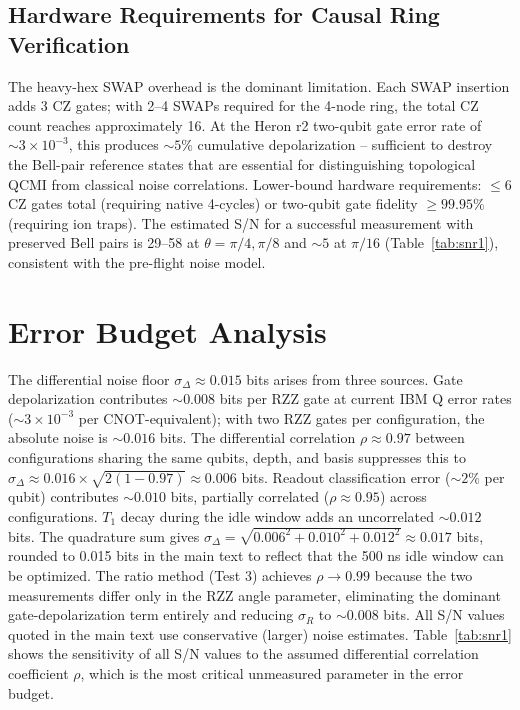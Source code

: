 \documentclass[aps,prl,superscriptaddress,nofootinbib]{revtex4-2}
\begin{document}
\subsection{Hardware Requirements for Causal Ring Verification}

The heavy-hex SWAP overhead is the dominant limitation. Each SWAP insertion adds 3 CZ gates; with 2--4 SWAPs required for the 4-node ring, the total CZ count reaches approximately 16. At the Heron r2 two-qubit gate error rate of $\sim3\times10^{-3}$, this produces $\sim5\%$ cumulative depolarization -- sufficient to destroy the Bell-pair reference states that are essential for distinguishing topological QCMI from classical noise correlations. Lower-bound hardware requirements: $\leq6$ CZ gates total (requiring native 4-cycles) or two-qubit gate fidelity $\geq99.95\%$ (requiring ion traps). The estimated S/N for a successful measurement with preserved Bell pairs is 29--58 at $\theta=\pi/4,\pi/8$ and $\sim5$ at $\pi/16$ (Table~\ref{tab:snr1}), consistent with the pre-flight noise model.


\section{Error Budget Analysis}


The differential noise floor $\sigma_\Delta \approx 0.015$ bits arises from three sources. Gate depolarization contributes $\sim0.008$ bits per RZZ gate at current IBM Q error rates ($\sim3 \times 10^{-3}$ per CNOT-equivalent); with two RZZ gates per configuration, the absolute noise is $\sim0.016$ bits. The differential correlation $\rho\approx 0.97$ between configurations sharing the same qubits, depth, and basis suppresses this to $\sigma_\Delta\approx 0.016 \times\sqrt{2(1-0.97)} \approx 0.006$ bits. Readout classification error ($\sim2\%$ per qubit) contributes $\sim0.010$ bits, partially correlated ($\rho\approx 0.95$) across configurations. $T_1$ decay during the idle window adds an uncorrelated $\sim0.012$ bits. The quadrature sum gives $\sigma_\Delta = \sqrt{0.006^2 + 0.010^2 + 0.012^2} \approx 0.017$ bits, rounded to 0.015 bits in the main text to reflect that the 500 ns idle window can be optimized. The ratio method (Test 3) achieves $\rho\to 0.99$ because the two measurements differ only in the RZZ angle parameter, eliminating the dominant gate-depolarization term entirely and reducing $\sigma_R$ to $\sim0.008$ bits. All S/N values quoted in the main text use conservative (larger) noise estimates. Table~\ref{tab:snr1} shows the sensitivity of all S/N values to the assumed differential correlation coefficient $\rho$, which is the most critical unmeasured parameter in the error budget.
\end{document}
